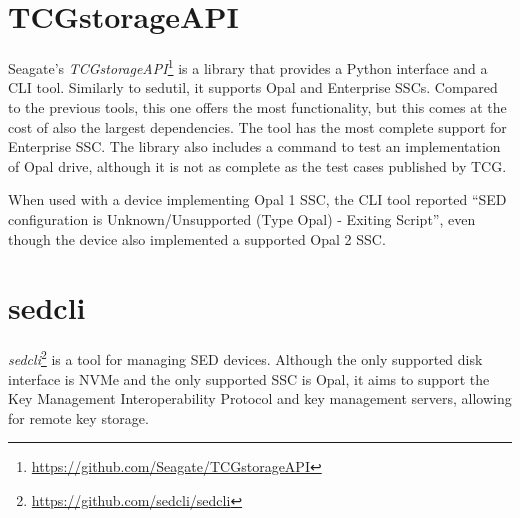 
\section{TCGstorageAPI}

Seagate's \emph{TCGstorageAPI}\footnote{\url{https://github.com/Seagate/TCGstorageAPI}} is a library that provides a Python interface and a CLI tool. Similarly to sedutil, it supports Opal and Enterprise SSCs.
Compared to the previous tools, this one offers the most functionality, but this comes at the cost of also the largest dependencies. The tool has the most complete support for Enterprise SSC.
The library also includes a command to test an implementation of Opal drive, although it is not as complete as the test cases published by TCG.


When used with a device implementing Opal 1 SSC, the CLI tool reported ``SED configuration is Unknown/Unsupported (Type Opal) - Exiting Script'', even though the device also implemented a supported Opal 2 SSC.





\section{sedcli}

\emph{sedcli}\footnote{\url{https://github.com/sedcli/sedcli}} is a tool for managing SED devices. Although the only supported disk interface is NVMe and the only supported SSC is Opal, it aims to support the Key Management Interoperability Protocol and key management servers, allowing for remote key storage.

